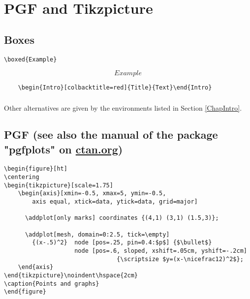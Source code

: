 \chapter{PGF and Tikzpicture}
\section{Boxes}
\begin{verbatim}
\boxed{Example}
\end{verbatim}
\[\boxed{Example}\]

\begin{verbatim}
	\begin{Intro}[colbacktitle=red]{Title}{Text}\end{Intro}
\end{verbatim}

\paragraph*{}
Other alternatives are given by the environments listed in Section \ref{ChapIntro}.





\section{PGF (see also the manual of the package "pgfplots" on \texorpdfstring{\url{ctan.org}}{ctan.org})}
\begin{center}
\end{center}

\newpage
\begin{verbatim}
\begin{figure}[ht]
\centering
\begin{tikzpicture}[scale=1.75]
    \begin{axis}[xmin=-0.5, xmax=5, ymin=-0.5,
	    axis equal, xtick=data, ytick=data, grid=major]
        
      \addplot[only marks] coordinates {(4,1) (3,1) (1.5,3)};
   	    
      \addplot[mesh, domain=0:2.5, tick=\empty]
        {(x-.5)^2}  node [pos=.25, pin=0.4:$p$] {$\bullet$}
   	                node [pos=.6, sloped, xshift=.05cm, yshift=-.2cm]
                                {\scriptsize $y=(x-\nicefrac12)^2$};
    \end{axis}
\end{tikzpicture}\noindent\hspace{2cm}
\caption{Points and graphs}
\end{figure}
\end{verbatim}



